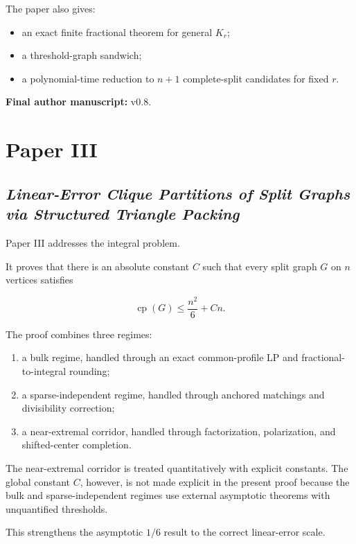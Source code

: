 \documentclass[11pt,a4paper]{article}
\begin{document}
The paper also gives:

\begin{itemize}
\item an exact finite fractional theorem for general \(K_r\);
\item a threshold-graph sandwich;
\item a polynomial-time reduction to \(n+1\) complete-split candidates for fixed \(r\).
\end{itemize}

\textbf{Final author manuscript:} v0.8.

\section{Paper III}

\subsection{\texorpdfstring{\emph{Linear-Error Clique Partitions of Split Graphs via Structured Triangle Packing}}{Linear-Error Clique Partitions of Split Graphs via Structured Triangle Packing}}

Paper III addresses the integral problem.

It proves that there is an absolute constant \(C\) such that every split graph \(G\) on \(n\) vertices satisfies

\[
\operatorname{cp}(G)
\le
\frac{n^2}{6}+Cn.
\]

The proof combines three regimes:

\begin{enumerate}
\item a bulk regime, handled through an exact common-profile LP and fractional-to-integral rounding;
\item a sparse-independent regime, handled through anchored matchings and divisibility correction;
\item a near-extremal corridor, handled through factorization, polarization, and shifted-center completion.
\end{enumerate}

The near-extremal corridor is treated quantitatively with explicit constants. The global constant \(C\), however, is not made explicit in the present proof because the bulk and sparse-independent regimes use external asymptotic theorems with unquantified thresholds.

This strengthens the asymptotic \(1/6\) result to the correct linear-error scale.
\end{document}
